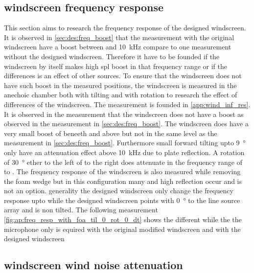 \subsection{windscreen frequency response}\label{sec:ds:wind_freq_res}
This section aims to research the frequency response of the designed windscreen. It is observed in \autoref{sec:des:freq_boost} that the measurement with the original windscreen have a boost between  and \SI{10}{\kilo\hertz} compare to one measurement without the designed windscreen. Therefore it have to be founded if the windscreen by itself makes high \gls{spl} boost in that frequency range or if the differences is an effect of other sources. To ensure that the windscreen does not have such boost in the measured positions, the windscreen is measured in the anechoic chamber both with tilting and with rotation to research the effect of differences of the windscreen. The measurement is founded in \autoref{app:wind_inf_res}. It is observed in the measurement that the windscreen does not have a boost as observed in the measurement in \autoref{sec:des:freq_boost}. The windscreen does have a very small boost of  beneeth  and above  but not in the same level as the measurement in \autoref{sec:des:freq_boost}. Furthermore small forward tilting upto \SI{9}{\degree} only have an attenuation effect above \SI{10}{\kilo\hertz} due to plate reflection. A rotation of \SI{30}{\degree} ether to the left of to the right does attenuate in the frequency range of  to . The frequency response of the windscreen is also measured while removing the foam wedge but in this configuration many and high reflection occur and is not an option. generality the designed windscreen only change the frequency response upto  while the designed windscreen points with \SI{0}{\degree} to the line source array and is non tilted. The following measurement \autoref{fig:ap:freq_resp_with_foa_til_0_rot_0_dt} shows the different while the the microphone only is equired with the original modified windscreen and with the designed windscreen



\subsection{windscreen wind noise attenuation}\label{sec:ds:wind_noi_att}

